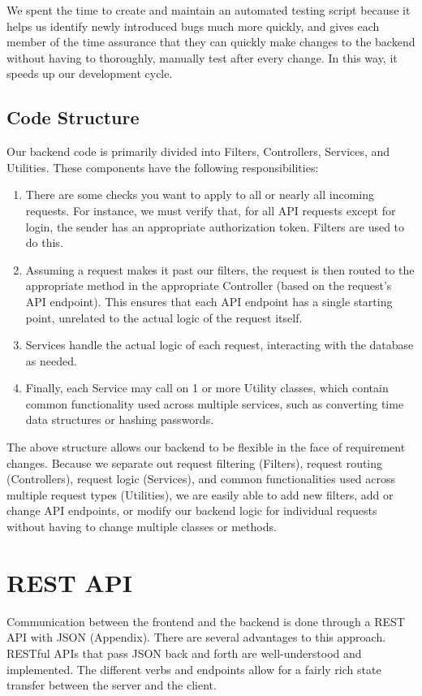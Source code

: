 \documentclass[12pt]{article}
\begin{document}
We spent the time to create and maintain an automated testing script because it helps us identify newly introduced bugs much more quickly, and gives each member of the time assurance that they can quickly make changes to the backend without having to thoroughly, manually test after every change. In this way, it speeds up our development cycle. 

\subsection{Code Structure}
Our backend code is primarily divided into Filters, Controllers, Services, and Utilities. These components have the following responsibilities: 
\begin{enumerate}
    \item There are some checks you want to apply to all or nearly all incoming requests. For instance, we must verify that, for all API requests except for login, the sender has an appropriate authorization token. Filters are used to do this. 
    \item Assuming a request makes it past our filters, the request is then routed to the appropriate method in the appropriate Controller (based on the request's API endpoint). This ensures that each API endpoint has a single starting point, unrelated to the actual logic of the request itself. 
    \item Services handle the actual logic of each request, interacting with the database as needed. 
    \item Finally, each Service may call on 1 or more Utility classes, which contain common functionality used across multiple services, such as converting time data structures or hashing passwords. 
\end{enumerate}

The above structure allows our backend to be flexible in the face of requirement changes. Because we separate out request filtering (Filters), request routing (Controllers), request logic (Services), and common functionalities used across multiple request types (Utilities), we are easily able to add new filters, add or change API endpoints, or modify our backend logic for individual requests without having to change multiple classes or methods. 

\section{REST API}
\label{sec:REST}
Communication between the frontend and the backend is done through a REST API with JSON (Appendix). There are several advantages to this approach. RESTful APIs that pass JSON back and forth are well-understood and implemented. The different verbs and endpoints allow for a fairly rich state transfer between the server and the client.
\end{document}
